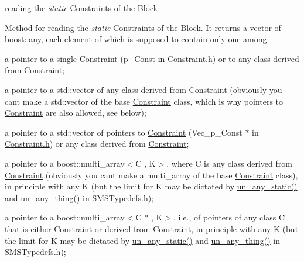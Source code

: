 reading the {\itshape static} Constraints of the \mbox{\hyperlink{class_s_m_spp__di__unipi__it_1_1_block}{Block}} 

Method for reading the {\itshape static} Constraints of the \mbox{\hyperlink{class_s_m_spp__di__unipi__it_1_1_block}{Block}}. It returns a vector of boost\+::any, each element of which is supposed to contain only one among\+:


\begin{DoxyItemize}
\item a pointer to a single \mbox{\hyperlink{class_s_m_spp__di__unipi__it_1_1_constraint}{Constraint}} (p\+\_\+\+Const in \mbox{\hyperlink{_constraint_8h}{Constraint.\+h}}) or to any class derived from \mbox{\hyperlink{class_s_m_spp__di__unipi__it_1_1_constraint}{Constraint}};
\item a pointer to a std\+::vector of any class derived from \mbox{\hyperlink{class_s_m_spp__di__unipi__it_1_1_constraint}{Constraint}} (obviously you can\textquotesingle{}t make a std\+::vector of the base \mbox{\hyperlink{class_s_m_spp__di__unipi__it_1_1_constraint}{Constraint}} class, which is why pointers to \mbox{\hyperlink{class_s_m_spp__di__unipi__it_1_1_constraint}{Constraint}} are also allowed, see below);
\item a pointer to a std\+::vector of pointers to \mbox{\hyperlink{class_s_m_spp__di__unipi__it_1_1_constraint}{Constraint}} (Vec\+\_\+p\+\_\+\+Const $\ast$ in \mbox{\hyperlink{_constraint_8h}{Constraint.\+h}}) or any class derived from \mbox{\hyperlink{class_s_m_spp__di__unipi__it_1_1_constraint}{Constraint}};
\item a pointer to a boost\+::multi\+\_\+array$<$\+C , K$>$, where C is any class derived from \mbox{\hyperlink{class_s_m_spp__di__unipi__it_1_1_constraint}{Constraint}} (obviously you can\textquotesingle{}t make a multi\+\_\+array of the base \mbox{\hyperlink{class_s_m_spp__di__unipi__it_1_1_constraint}{Constraint}} class), in principle with any K (but the limit for K may be dictated by \mbox{\hyperlink{group__boost__any__stuff_ga8ec1a694aa7a5fa58ab801c1ea419fa8}{un\+\_\+any\+\_\+static()}} and \mbox{\hyperlink{group__boost__any__stuff_gab299af634bc1ca9be3a8d45a14560036}{un\+\_\+any\+\_\+thing()}} in \mbox{\hyperlink{_s_m_s_typedefs_8h}{S\+M\+S\+Typedefs.\+h}});
\item a pointer to a boost\+::multi\+\_\+array$<$\+C $\ast$ , K$>$, i.\+e., of pointers of any class C that is either \mbox{\hyperlink{class_s_m_spp__di__unipi__it_1_1_constraint}{Constraint}} or derived from \mbox{\hyperlink{class_s_m_spp__di__unipi__it_1_1_constraint}{Constraint}}, in principle with any K (but the limit for K may be dictated by \mbox{\hyperlink{group__boost__any__stuff_ga8ec1a694aa7a5fa58ab801c1ea419fa8}{un\+\_\+any\+\_\+static()}} and \mbox{\hyperlink{group__boost__any__stuff_gab299af634bc1ca9be3a8d45a14560036}{un\+\_\+any\+\_\+thing()}} in \mbox{\hyperlink{_s_m_s_typedefs_8h}{S\+M\+S\+Typedefs.\+h}});
\end{DoxyItemize}

